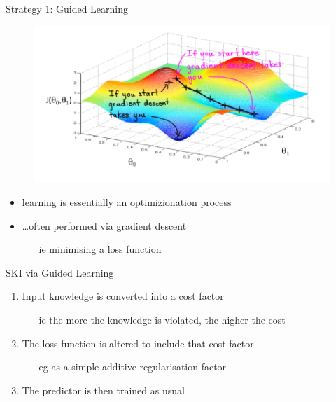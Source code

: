 \documentclass[presentation]{beamer}\mode<presentation>{\usetheme{AMSBolognaFC}}
\begin{document}
\begin{frame}[allowframebreaks]{Strategy 1: Guided Learning}

    \begin{figure}
        \centering
        \includegraphics[width=0.7\linewidth]{figures/nn-gradient-descent.png}
    \end{figure}   
    \begin{itemize}
        \item learning is essentially an \alert{optimizionation} process
        \item \ldots often performed via \alert{gradient descent}
        \begin{itemize}
            \item[ie] minimising a \alert{loss function}
        \end{itemize}
    \end{itemize}

    \framebreak

    \begin{block}{SKI via Guided Learning}
        \begin{enumerate}
            \item Input knowledge is converted into a \alert{cost factor} 
            \begin{itemize}
                \item[ie] the more the knowledge is violated, the higher the cost
            \end{itemize}
            
            \item The loss function is altered to \alert{include} that cost factor
            \begin{itemize}
                \item[eg] as a simple additive regularisation factor
            \end{itemize}
            
            \item The predictor is then trained \alert{as usual}
            

\end{enumerate}
\end{block}
\end{frame}
\end{document}
